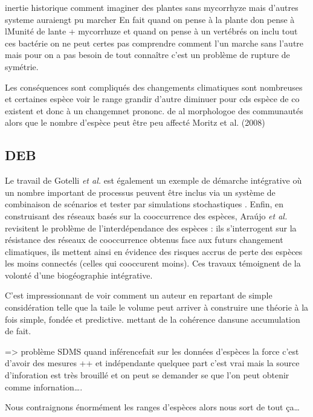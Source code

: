 inertie historique comment imaginer des plantes sans mycorrhyze mais
d'autres systeme auraiengt pu marcher En fait quand on pense à la plante
don pense à lMunité de lante + mycorrhuze et quand on pense à un
vertébrés on inclu tout ces bactérie on ne peut certes pas comprendre
comment l'un marche sans l'autre mais pour on a pas besoin de tout
connaître c'est un problème de rupture de symétrie.

Les conséquences sont compliqués des changements climatiques sont
nombreuses et certaines espèce voir le range grandir d'autre diminuer
pour cds espèce de co existent et donc à un changemnet prononc. de al
morphologoe des communautés alors que le nombre d'espèce peut être peu
affecté Moritz et al. (2008)

\subsection{DEB}\label{deb}

Le travail de Gotelli \textit{et al.} est également un exemple de
démarche intégrative où un nombre important de processus peuvent être
inclus via un système de combinaison de scénarios et tester par
simulations stochastiques \cite{Gotelli2009}. Enfin, en construisant des
réseaux basés sur la cooccurrence des espèces, Araújo \textit{et al.}
revisitent le problème de l'interdépendance des espèces
\cite{Araujo2011} : ils s'interrogent sur la résistance des réseaux de
cooccurrence obtenus face aux futurs changement climatiques, ils mettent
ainsi en évidence des risques accrus de perte des espèces les moins
connectés (celles qui cooccurent moins). Ces travaux témoignent de la
volonté d'une biogéographie intégrative.

C'est impressionnant de voir comment un auteur en repartant de simple
considération telle que la taile le volume peut arriver à construire une
théorie à la fois simple, fondée et predictive. mettant de la cohérence
dansune accumulation de fait.

=\textgreater{} problème SDMS quand inférencefait sur les données
d'espèces la force c'est d'avoir des mesures ++ et indépendante quelquee
part c'est vrai mais la source d'inforation est très brouillé et on peut
se demander se que l'on peut obtenir comme infornation\ldots{}.

Nous contraignons énormément les ranges d'espèces alors nous sort de
tout ça\ldots{}

